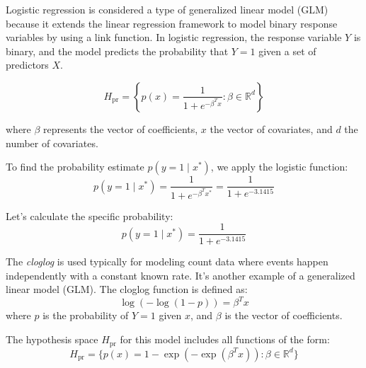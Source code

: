 \documentclass[12pt]{article}
\begin{document}

\begin{enumerate}

Logistic regression is considered a type of generalized linear model (GLM) because it extends the linear regression framework to model binary response variables by using a link function. In logistic regression, the response variable \( Y \) is binary, and the model predicts the probability that \( Y = 1 \) given a set of predictors \( X \).



\[
H_{\text{pr}} = \left\{ p(x) = \frac{1}{1 + e^{-\beta^T x}} : \beta \in \mathbb{R}^d \right\}
\]

where \(\beta\) represents the vector of coefficients, \(x\) the vector of covariates, and \(d\) the number of covariates.



To find the probability estimate \(p(y=1 \mid x^*)\), we apply the logistic function:
\[
p(y=1 \mid x^*) = \frac{1}{1 + e^{-\beta^T x^*}} = \frac{1}{1 + e^{-3.1415}}
\]

Let's calculate the specific probability:
\[
p(y=1 \mid x^*) = \frac{1}{1 + e^{-3.1415}}
\]



The \textit{cloglog} is used typically for modeling count data where events happen independently with a constant known rate. It’s another example of a generalized linear model (GLM). The cloglog function is defined as:
\[
\log(-\log(1-p)) = \beta^T x
\]
where \(p\) is the probability of \(Y=1\) given \(x\), and \(\beta\) is the vector of coefficients.

The hypothesis space \(H_{\text{pr}}\) for this model includes all functions of the form:
\[
H_{\text{pr}} = \{p(x) = 1 - \exp(-\exp(\beta^T x)) : \beta \in \mathbb{R}^d\}
\]



\end{enumerate}
\end{document}
